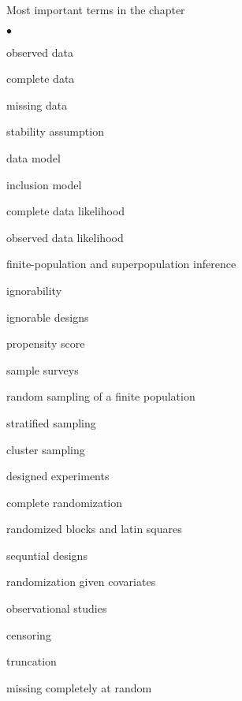 \documentclass[a4paper,11pt,english]{article}
\begin{document}
Most important terms in the chapter
\begin{list}{$\bullet$}{\parsep=0pt\itemsep=2pt}
\item observed data
\item complete data
\item missing data
\item stability assumption
\item data model
\item inclusion model
\item complete data likelihood
\item observed data likelihood
\item finite-population and superpopulation inference
\item ignorability
\item ignorable designs
\item propensity score
\item sample surveys
\item random sampling of a finite population
\item stratified sampling
\item cluster sampling
\item designed experiments
\item complete randomization
\item randomized blocks and latin squares
\item sequntial designs
\item randomization given covariates
\item observational studies
\item censoring
\item truncation
\item missing completely at random
\end{list}

\end{document}
